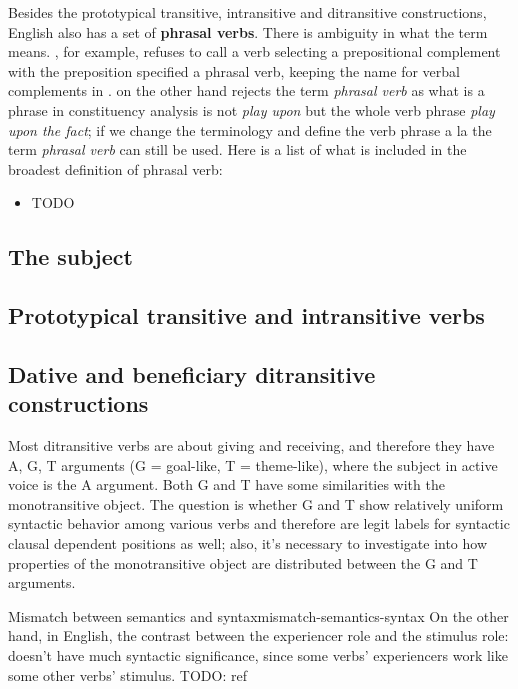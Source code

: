 \documentclass[UTF8, a4paper, oneside, scheme=plain, 12pt]{ctexbook}
\newcommand*{\citepage}[1]{p.~{#1}}
\newcommand*{\concept}[1]{\textbf{#1}}
\newcommand*{\term}[1]{\emph{#1}}
\newcommand{\form}[1]{\emph{#1}}
\begin{document}
Besides the prototypical transitive, intransitive and ditransitive constructions,
English also has a set of \concept{phrasal verbs}.
There is ambiguity in what the term means.
\citet[\citepage{289}]{dixon2005semantic}, for example,
refuses to call a verb selecting a prepositional complement with the preposition specified
a phrasal verb,
keeping the name for verbal complements in \citet{cgel}.
\citet{cgel} on the other hand rejects the term \term{phrasal verb} 
as what is a phrase in constituency analysis is not \form{play upon} 
but the whole verb phrase \form{play upon the fact};
if we change the terminology and define the verb phrase a la 
\citet[\citepage{41}]{dixon2005semantic}
the term \term{phrasal verb} can still be used.
Here is a list of what is included in the broadest definition of phrasal verb:
\begin{itemize}
    \item TODO
\end{itemize}

\subsection{The subject}\label{sec:subject}

\subsection{Prototypical transitive and intransitive verbs}



\subsection{Dative and beneficiary ditransitive constructions}

Most ditransitive verbs are about giving and receiving,
and therefore they have A, G, T arguments (G = goal-like, T = theme-like),
where the subject in active voice is the A argument.
Both G and T have some similarities with the monotransitive object. 
The question is whether G and T show relatively uniform syntactic behavior
among various verbs
and therefore are legit labels for syntactic clausal dependent positions as well;
also, it's necessary to investigate into how properties of the monotransitive object 
are distributed between the G and T arguments.

\begin{infobox}{Mismatch between semantics and syntax}{mismatch-semantics-syntax}
    On the other hand, 
    in English, the contrast between the experiencer role and the stimulus role:
    doesn't have much syntactic significance,
    since some verbs' experiencers work like some other verbs' stimulus. TODO: ref
\end{infobox}
\end{document}
